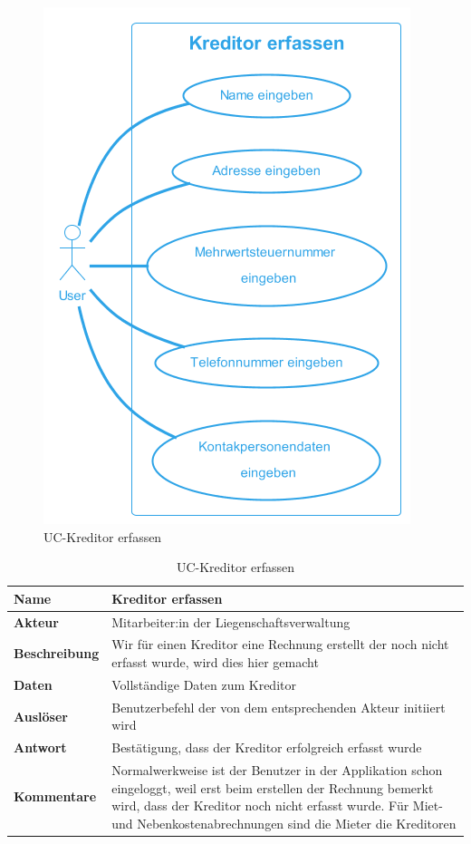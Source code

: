 \begin{figure}[H]
  \begin{center}
    \includegraphics[width=0.5\linewidth]{content/diagrams/out/usecase/kreditorErfassen/Kreditor erfassen.png}
    \caption{UC-Kreditor erfassen}
    \label{kreditorErfassen}
  \end{center}
\end{figure}

\begin{table}[H]
  \centering
  \settowidth{}
  \setlength\extrarowheight{2pt}
  \begin{tabulary}{1.0\textwidth}{|a|m{14cm}|}
    \hline
    \textbf{Name}& Kreditor erfassen\\
    \hline
    \textbf{Akteur}& Mitarbeiter:in der Liegenschaftsverwaltung\\
    \hline 
    \textbf{Beschreibung} & Wir für einen Kreditor eine Rechnung erstellt der noch nicht erfasst wurde, wird dies hier gemacht\\
    \hline
    \textbf{Daten} & Vollständige Daten zum Kreditor\\
    \hline
    \textbf{Auslöser} & Benutzerbefehl der von dem entsprechenden Akteur initiiert wird\\
    \hline
    \textbf{Antwort} & Bestätigung, dass der Kreditor erfolgreich erfasst wurde\\
    \hline
    \textbf{Kommentare} & Normalwerkweise ist der Benutzer in der Applikation schon eingeloggt, weil erst beim erstellen der Rechnung bemerkt wird, dass der Kreditor noch nicht erfasst wurde. Für Miet-und Nebenkostenabrechnungen sind die Mieter die Kreditoren \\
    \hline
  \end{tabulary}
  \caption{UC-Kreditor erfassen}
\end{table}

